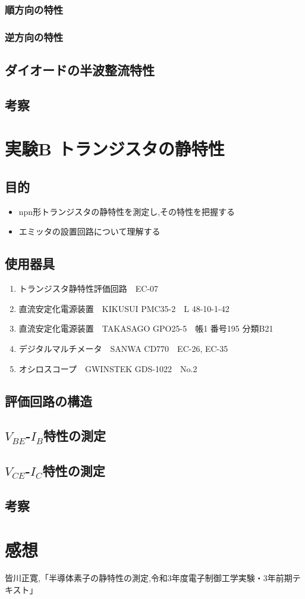 \documentclass[titlepage]{jarticle}
\begin{document}
\subsubsection{順方向の特性}
\subsubsection{逆方向の特性}
\subsection{ダイオードの半波整流特性}
\subsection{考察}

\newpage
\section{実験B トランジスタの静特性}
\subsection{目的}
\begin{itemize}
    \item npn形トランジスタの静特性を測定し,その特性を把握する
    \item エミッタの設置回路について理解する
\end{itemize}
\subsection{使用器具}
\begin{enumerate}
    \item トランジスタ静特性評価回路　EC-07
    \item 直流安定化電源装置　KIKUSUI PMC35-2　L 48-10-1-42
    \item 直流安定化電源装置　TAKASAGO GPO25-5　帳1 番号195 分類B21
    \item デジタルマルチメータ　SANWA CD770　EC-26, EC-35
    \item オシロスコープ　GWINSTEK GDS-1022　No.2
\end{enumerate}
\subsection{評価回路の構造}
\subsection{$V_{BE}$-$I_B$特性の測定}
\subsection{$V_{CE}$-$I_C$特性の測定}
\subsection{考察}

\newpage
\section{感想}

\begin{thebibliography}{99}
    \bibitem{}皆川正寛,「半導体素子の静特性の測定,令和3年度電子制御工学実験・3年前期テキスト」
\end{thebibliography}
\end{document}
